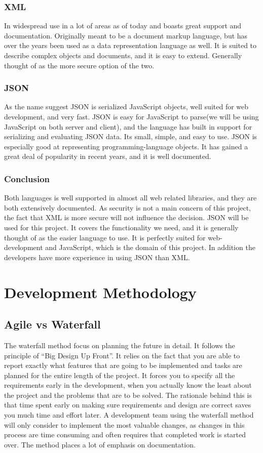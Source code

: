 \subsubsection{XML}
In widespread use in a lot of areas as of today and boasts great support and documentation. Originally meant to be a document markup language, but has over the years been used as a data representation language as well. It is suited to describe complex objects and documents, and it is easy to extend. Generally thought of as the more secure option of the two.

\subsubsection{JSON}
As the name suggest JSON is serialized JavaScript objects, well suited for web development, and very fast. JSON is easy for JavaScript to parse(we will be using JavaScript on both server and client), and the language has built in support for serializing and evaluating JSON data. Its small, simple, and easy to use. JSON is especially good at representing programming-language objects. It has gained a great deal of popularity in recent years, and it is well documented.

\subsubsection{Conclusion}
Both languages is well supported in almost all web related libraries, and they are both extensively documented. As security is not a main concern of this project, the fact that XML is more secure will not influence the decision. JSON will be used for this project. It covers the functionality we need, and it is generally thought of as the easier language to use. It is perfectly suited for web- development and JavaScript, which is the domain of this project. In addition the developers have more experience in using JSON than XML.

\section{Development Methodology}
\subsection{Agile vs Waterfall}
The waterfall method focus on planning the future in detail. It follows the principle of “Big Design Up Front”. It relies on the fact that you are able to report exactly what features that are going to be implemented and tasks are planned for the entire length of the project. It forces you to specify all the requirements early in the development, when you actually know the least about the project and the problems that are to be solved. The rationale behind this is that time spent early on making sure requirements and design are correct saves you much time and effort later. A development team using the waterfall method will only consider to implement the most valuable changes, as changes in this process are time consuming and often requires that completed work is started over. The method places a lot of emphasis on documentation. 

